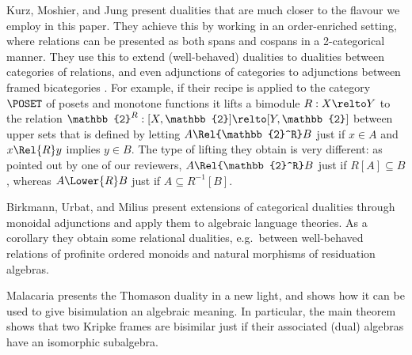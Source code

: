 Kurz, Moshier, and Jung \cite{kurz_2023} present dualities that are
much closer to the flavour we employ in this paper. They achieve this
by working in an order-enriched setting, where relations can be
presented as both spans and cospans in a 2-categorical manner. They
use this to extend (well-behaved) dualities to dualities between
categories of relations, and even adjunctions of categories to
adjunctions between framed bicategories \cite{shulman_2008}. For
example, if their recipe is applied to the category $\POSET$ of posets
and monotone functions it lifts a bimodule $R : X \relto Y$ to the
relation $\mathbb{2}^R : [X, \mathbb{2}] \relto [Y, \mathbb{2}]$
between upper sets that is defined by letting $A \Rel{\mathbb{2}^R} B$
just if $x \in A$ and $x \Rel{R} y$ implies $y \in B$. The type of
lifting they obtain is very different: as pointed out by one of our
reviewers, $A \Rel{\mathbb{2}^R} B$ just if $R[A] \subseteq B$,
whereas $A \Lower{R} B$ just if $A \subseteq R^{-1}[B]$.

Birkmann, Urbat, and Milius \cite{birkmann_2024} present extensions of
categorical dualities through monoidal adjunctions and apply them to algebraic
language theories. As a corollary they obtain some relational dualities, e.g.\
between well-behaved relations of profinite ordered monoids and natural
morphisms of residuation algebras.

Malacaria \cite{malacaria_1995} presents the Thomason duality in a new light,
and shows how it can be used to give bisimulation an algebraic meaning. In
particular, the main theorem shows that two Kripke frames are bisimilar just if
their associated (dual) algebras have an isomorphic subalgebra.


